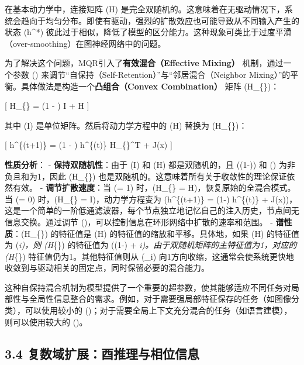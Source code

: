 \documentclass[
  12pt,
]{article}
\begin{document}
在基本动力学中，连接矩阵 (H)
是完全双随机的。这意味着在无驱动情况下，系统会趋向于均匀分布。即使有驱动，强烈的扩散效应也可能导致从不同输入产生的状态
(h\^{}*)
彼此过于相似，降低了模型的区分能力。这种现象可类比于过度平滑（over-smoothing）在图神经网络中的问题。

为了解决这个问题，MQR引入了\textbf{有效混合（Effective Mixing）}
机制，通过一个参数 (\beta \in [0, 1])
来调节``自保持（Self-Retention）''与``邻居混合（Neighbor
Mixing）''的平衡。具体做法是构造一个\textbf{凸组合（Convex
Combination）} 矩阵 (H\_\{\})：

{[} H\_\{\} = (1 - \beta) I + \beta H {]}

其中 (I) 是单位矩阵。然后将动力学方程中的 (H) 替换为
(H\_\{\})：

{[} h\^{}\{(t+1)\} = (1 - \alpha) h\^{}\{(t)\} H\_\{\}\^{}T +
\alpha J(x) {]}

\textbf{性质分析}： - \textbf{保持双随机性}：由于 (I) 和 (H)
都是双随机的，且 ((1-\beta)) 和 (\beta) 为非负且和为1，因此
(H\_\{\})
也是双随机的。这意味着所有关于收敛性的理论保证依然有效。 -
\textbf{调节扩散速度}：当 (\beta = 1) 时，(H\_\{\} =
H)，恢复原始的全混合模式。当 (\beta = 0) 时，(H\_\{\} =
I)，动力学方程变为 (h\^{}\{(t+1)\} = (1-\alpha) h\^{}\{(t)\} +
\alpha J(x))，这是一个简单的一阶低通滤波器，每个节点独立地记忆自己的注入历史，节点间无信息交换。通过调节
(\beta)，可以控制信息在环形网络中扩散的速率和范围。 -
\textbf{谱性质}：(H\_\{\}) 的特征值是 (H)
的特征值的缩放和平移。具体地，如果 (H) 的特征值为 (\lambda\emph{i)，则
(H}\{\}) 的特征值为 ((1-\beta) +
\beta \lambda\emph{i)。由于双随机矩阵的主特征值为1，对应的
(H}\{\}) 特征值仍为1。其他特征值则从 (\lambda\_i)
向1方向收缩，这通常会使系统更快地收敛到与驱动相关的固定点，同时保留必要的混合能力。

这种自保持混合机制为模型提供了一个重要的超参数，使其能够适应不同任务对局部性与全局性信息整合的需求。例如，对于需要强局部特征保存的任务（如图像分类），可以使用较小的
(\beta)；对于需要全局上下文充分混合的任务（如语言建模），则可以使用较大的
(\beta)。

\hypertarget{ux590dux6570ux57dfux6269ux5c55ux9149ux63a8ux7406ux4e0eux76f8ux4f4dux4fe1ux606f}{%
\subsection{3.4
复数域扩展：酉推理与相位信息}\label{ux590dux6570ux57dfux6269ux5c55ux9149ux63a8ux7406ux4e0eux76f8ux4f4dux4fe1ux606f}}
\end{document}
